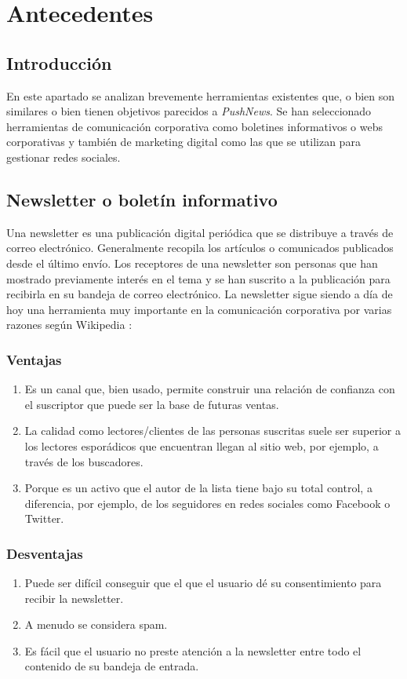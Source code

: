 \chapter{Antecedentes}

\section{Introducción}
En este apartado se analizan brevemente herramientas existentes que, o bien son similares o bien tienen objetivos parecidos a \emph{PushNews}. Se han seleccionado herramientas de comunicación corporativa como boletines informativos o webs corporativas y también de marketing digital como las que se utilizan para gestionar redes sociales.

\section{Newsletter o boletín informativo}
Una newsletter es una publicación digital periódica que se distribuye a través de correo electrónico. Generalmente recopila los artículos o comunicados publicados desde el último envío. Los receptores de una newsletter son personas que han mostrado previamente interés en el tema y se han suscrito a la publicación para recibirla en su bandeja de correo electrónico. La newsletter sigue siendo a día de hoy una herramienta muy importante en la comunicación corporativa por varias razones según Wikipedia \cite{wiki_boletininformativo}:
\subsection*{Ventajas}
\begin{enumerate}
    \item Es un canal que, bien usado, permite construir una relación de confianza con el suscriptor que puede ser la base de futuras ventas.
    \item La calidad como lectores/clientes de las personas suscritas suele ser superior a los lectores esporádicos que encuentran llegan al sitio web, por ejemplo, a través de los buscadores.
    \item Porque es un activo que el autor de la lista tiene bajo su total control, a diferencia, por ejemplo, de los seguidores en redes sociales como Facebook o Twitter.
\end{enumerate}

\subsection*{Desventajas}
\begin{enumerate}
    \item Puede ser difícil conseguir que el que el usuario dé su consentimiento para recibir la newsletter.
    \item A menudo se considera spam.
    \item Es fácil que el usuario no preste atención a la newsletter entre todo el contenido de su bandeja de entrada.
\end{enumerate}

